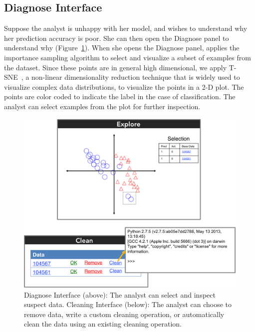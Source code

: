 \subsection{Diagnose Interface}
Suppose the analyst is unhappy with her model, and wishes to understand why her prediction accuracy is poor.
She can then open the \textsf{Diagnose} panel to understand why (Figure~\ref{diag}).
When she opens the \textsf{Diagnose} panel, \sys applies the importance sampling algorithm to select and visualize a subset of examples from the dataset.
Since these points are in general high dimensional, we apply T-SNE~\cite{van2008visualizing},
a non-linear dimensionality reduction technique that is widely used to visualize complex data distributions,
to visualize the points in a 2-D plot.
The points are color coded to indicate the label in the case of classification.
The analyst can select examples from the plot for further inspection.

\begin{figure}[t]
\centering
 \includegraphics[width=0.7\columnwidth]{figs/interface3.png}
 \caption{Diagnose Interface (above): The analyst can select and inspect suspect data. 
 Cleaning Interface (below): The analyst can choose to remove data, write a custom cleaning operation, or automatically clean the data using an existing cleaning operation.\label{diag}}
\end{figure}

